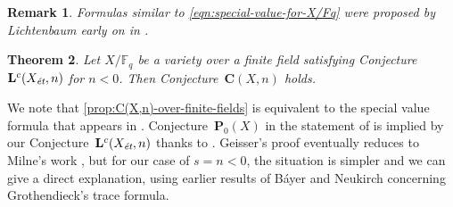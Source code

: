 \documentclass[10pt,a4paper,oneside,draft]{article}
\newcommand{\FF}{\mathbb{F}}
\newcommand{\et}{\text{\it \'{e}t}}
\theoremstyle{myplain}
\newtheorem{theorem}{Theorem}[section]
\theoremstyle{mydefinition}
\newtheorem{remark}[theorem]{Remark}
\numberwithin{equation}{section}
\begin{document}
\begin{remark}
  Formulas similar to \eqref{eqn:special-value-for-X/Fq} were proposed by
  Lichtenbaum early on in \cite{Lichtenbaum-1984}.
\end{remark}

\begin{theorem}
  \label{thm:C(X,n)-over-finite-fields}
  Let $X/\FF_q$ be a variety over a finite field satisfying
  Conjecture~$\mathbf{L}^c (X_\et, n)$ for $n < 0$. Then
  Conjecture~$\mathbf{C} (X,n)$ holds.
\end{theorem}

We note that \eqref{prop:C(X,n)-over-finite-fields} is equivalent to the special
value formula that appears in
\cite[Theorem~4.5]{Geisser-2010-arithmetic-homology}.
Conjecture~$\mathbf{P}_0 (X)$ in the statement of
\cite[Theorem~4.5]{Geisser-2010-arithmetic-homology} is implied by our
Conjecture~$\mathbf{L}^c (X_\et,n)$ thanks to
\cite[Proposition~4.1]{Geisser-2010-arithmetic-homology}. Geisser's proof
eventually reduces to Milne's work \cite{Milne-1986}, but for our case of
$s = n < 0$, the situation is simpler and we can give a direct explanation,
using earlier results of B\'{a}yer and Neukirch \cite{Bayer-Neukirch-1978}
concerning Grothendieck's trace formula.
\end{document}
